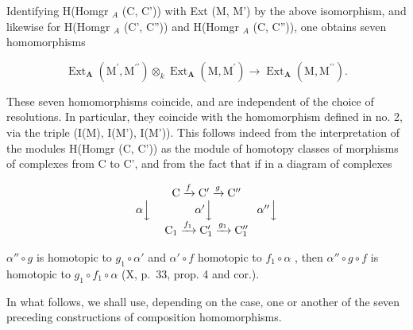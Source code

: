 Identifying H(Homgr \(_A\) (C, C')) with Ext (M, M') by the above isomorphism, and likewise for H(Homgr \(_A\) (C', C'')) and H(Homgr \(_A\) (C, C'')), one obtains seven homomorphisms

\[
\operatorname{Ext} _ {\mathbf {A}} \left(\mathrm{M} ^ {\prime}, \mathrm{M} ^ {\prime \prime}\right) \otimes_ {k} \operatorname{Ext} _ {\mathbf {A}} \left(\mathrm{M}, \mathrm{M} ^ {\prime}\right)\rightarrow \operatorname{Ext} _ {\mathbf {A}} \left(\mathrm{M}, \mathrm{M} ^ {\prime \prime}\right).
\]

These seven homomorphisms coincide, and are independent of the choice of resolutions. In particular, they coincide with the homomorphism defined in no. 2, via the triple (I(M), I(M'), I(M')). This follows indeed from the interpretation of the modules H(Homgr (C, C')) as the module of homotopy classes of morphisms of complexes from C to C', and from the fact that if in a diagram of complexes

\[
\begin{array}{c} \mathrm{C} \xrightarrow {f} \mathrm{C} ^ {\prime} \xrightarrow {g} \mathrm{C} ^ {\prime \prime} \\ \alpha \Big \downarrow \qquad \qquad \alpha^ {\prime} \Big \downarrow \qquad \qquad \alpha^ {\prime \prime} \Big \downarrow \\ \mathrm{C} _ {1} \xrightarrow {f _ {1}} \mathrm{C} _ {1} ^ {\prime} \xrightarrow {g _ {1}} \mathrm{C} _ {1} ^ {\prime \prime} \end{array}
\]

\(\alpha'' \circ g\) is homotopic to \(g_1 \circ \alpha'\) and \(\alpha' \circ f\) homotopic to \(f_1 \circ \alpha\) , then \(\alpha'' \circ g \circ f\) is homotopic to \(g_1 \circ f_1 \circ \alpha\) (X, p.~33, prop. 4 and cor.).

In what follows, we shall use, depending on the case, one or another of the seven preceding constructions of composition homomorphisms.

